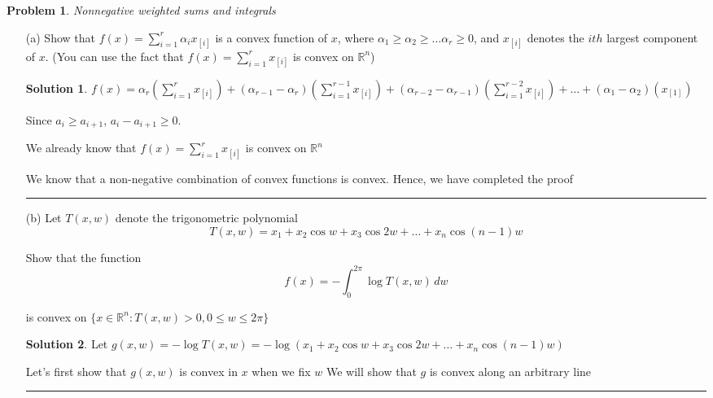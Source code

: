 \documentclass{article}
\theoremstyle{definition}
\newtheorem{problem}{Problem}
\def\fline{\rule{0.75\linewidth}{0.5pt}}
\newcommand{\finishline}{\begin{center}\fline\end{center}}
\newtheorem*{solution*}{Solution}
\newenvironment{solution}{\begin{solution*}}{{\finishline} \end{solution*}}
\begin{document}
\begin{problem}
    \textit{ Nonnegative weighted sums and integrals}
    \begin{itemize}
        \item[(a)] Show that $f(x) = \sum_{i=1}^{r} \alpha_i x_{[i]}$ is a convex function of $x$, where $\alpha_1 \geq \alpha_2 \geq \dots \alpha_r \geq 0$, and $x_{[i]}$  denotes the $ith$ largest component of $x$. (You can use the fact that $f(x) = \sum_{i=1}^{r}  x_{[i]}$ is convex on $\mathbb{R}^n$)

        \begin{solution}
            $f(x) = \alpha_r (\sum_{i=1}^{r}  x_{[i]}) + (\alpha_{r - 1} - \alpha_r) (\sum_{i=1}^{r - 1}  x_{[i]}) + (\alpha_{r - 2} - \alpha_{r - 1}) (\sum_{i=1}^{r - 2}  x_{[i]}) + \dots + (\alpha_{1} - \alpha_{2}) (x_{[1]})$ 

            Since $a_{i} \geq a_{i + 1}$, $a_{i} - a_{i + 1} \geq 0$. \newline

            We already know that $f(x) = \sum_{i=1}^{r}  x_{[i]}$ is convex on $\mathbb{R}^n$

            We know that a non-negative combination of convex functions is convex. Hence, we have completed the proof
        \end{solution}

        \item[(b)] Let $T(x, w)$  denote the trigonometric polynomial
        \begin{equation}
            T(x, w) = x_1 + x_2 \cos{w} + x_3 \cos{2w} + \dots + x_n \cos{(n - 1)w}
         \end{equation}

         
Show that the function 
\begin{equation}
    f(x) = - \int_{0}^{2\pi} \log T(x, w) \,dw
\end{equation}

is convex on $\{x \in \mathbb{R}^n : T(x, w) > 0, 0 \leq w \leq 2\pi\}$

\begin{solution}
    Let $g(x, w) = - \log T(x, w) = - \log(x_1 + x_2 \cos{w} + x_3 \cos{2w} + \dots + x_n \cos{(n - 1)w})$ \newline 

    Let's first show that $g(x, w)$ is convex in $x$ when we fix $w$ \newline 
    We will show that $g$ is convex along an arbitrary line \newline 
    

\end{solution}
\end{itemize}
\end{problem}
\end{document}
